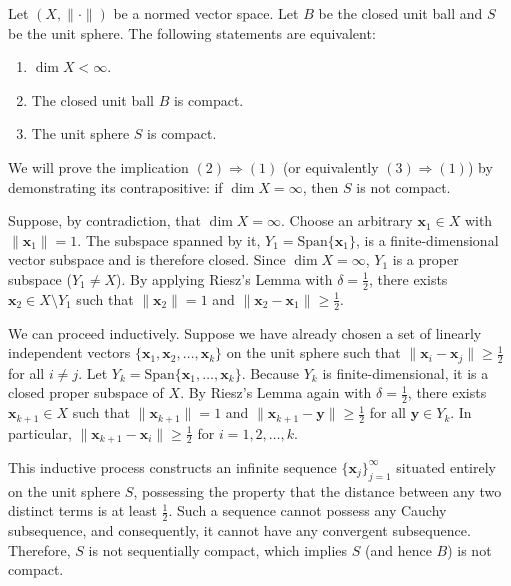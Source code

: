 
\begin{theorem}
    Let $(X, \|\cdot\|)$ be a normed vector space. Let $B$ be the closed unit ball and $S$ be the unit sphere. The following statements are equivalent:
    \begin{enumerate}
        \item $\dim X < \infty$.
        \item The closed unit ball $B$ is compact.
        \item The unit sphere $S$ is compact.
    \end{enumerate}
\end{theorem}

\begin{pfbox}
    We will prove the implication $(2) \Rightarrow (1)$ (or equivalently $(3) \Rightarrow (1)$) by demonstrating its contrapositive: if $\dim X = \infty$, then $S$ is not compact.

    Suppose, by contradiction, that $\dim X = \infty$.
    Choose an arbitrary $\mathbf{x}_1 \in X$ with $\|\mathbf{x}_1\| = 1$. The subspace spanned by it, $Y_1 = \text{Span}\{\mathbf{x}_1\}$, is a finite-dimensional vector subspace and is therefore closed. Since $\dim X = \infty$, $Y_1$ is a proper subspace ($Y_1 \neq X$).
    By applying Riesz's Lemma with $\displaystyle \delta = \frac{1}{2}$, there exists $\mathbf{x}_2 \in X \setminus Y_1$ such that $\|\mathbf{x}_2\| = 1$ and $\displaystyle \|\mathbf{x}_2 - \mathbf{x}_1\| \ge \frac{1}{2}$.
    
    We can proceed inductively. Suppose we have already chosen a set of linearly independent vectors $\{\mathbf{x}_1, \mathbf{x}_2, \dots, \mathbf{x}_k\}$ on the unit sphere such that $\displaystyle \|\mathbf{x}_i - \mathbf{x}_j\| \ge \frac{1}{2}$ for all $i \neq j$.
    Let $Y_k = \text{Span}\{\mathbf{x}_1, \dots, \mathbf{x}_k\}$. Because $Y_k$ is finite-dimensional, it is a closed proper subspace of $X$.
    By Riesz's Lemma again with $\displaystyle \delta = \frac{1}{2}$, there exists $\mathbf{x}_{k+1} \in X$ such that $\|\mathbf{x}_{k+1}\| = 1$ and $\displaystyle \|\mathbf{x}_{k+1} - \mathbf{y}\| \ge \frac{1}{2}$ for all $\mathbf{y} \in Y_k$. In particular, $\displaystyle \|\mathbf{x}_{k+1} - \mathbf{x}_i\| \ge \frac{1}{2}$ for $i = 1, 2, \dots, k$.

    This inductive process constructs an infinite sequence $\{\mathbf{x}_j\}_{j=1}^\infty$ situated entirely on the unit sphere $S$, possessing the property that the distance between any two distinct terms is at least $\displaystyle \frac{1}{2}$.
    Such a sequence cannot possess any Cauchy subsequence, and consequently, it cannot have any convergent subsequence.
    Therefore, $S$ is not sequentially compact, which implies $S$ (and hence $B$) is not compact.
\end{pfbox}

